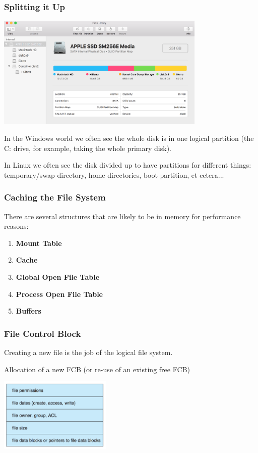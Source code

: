 \begin{frame}
\frametitle{Splitting it Up}

\begin{center}
	\includegraphics[width=0.75\textwidth]{images/partition-map.png}
\end{center}

In the Windows world we often see the whole disk is in one logical partition (the C: drive, for example, taking the whole primary disk). 

In Linux we often see the disk divided up to have partitions for different things: temporary/swap directory, home directories, boot partition, et cetera...

\end{frame}

\begin{frame}
\frametitle{Caching the File System}

There are several structures that are likely to be in memory for performance reasons:

\begin{enumerate}
	\item \textbf{Mount Table}
	\item \textbf{Cache}
	\item \textbf{Global Open File Table}
	\item \textbf{Process Open File Table}
	\item \textbf{Buffers}
\end{enumerate}

\end{frame}

\begin{frame}
\frametitle{File Control Block}

Creating a new file is the job of the logical file system. 

Allocation of a new FCB (or re-use of an existing free FCB)

\begin{center}
	\includegraphics[width=0.4\textwidth]{images/fcb.png}
\end{center}

\end{frame}

